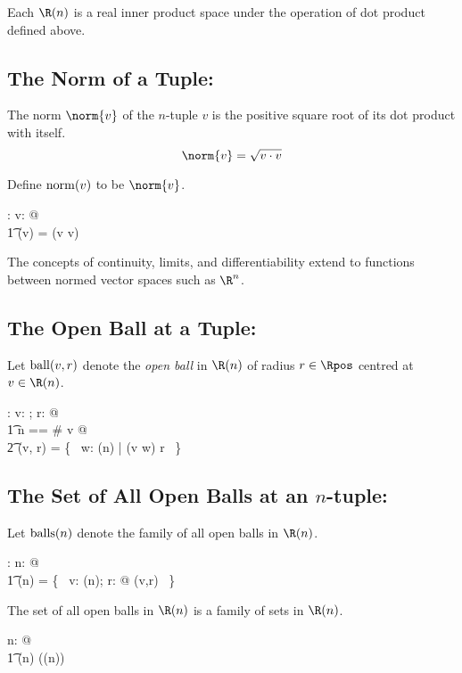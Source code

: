 \documentclass{amsart}
\begin{document}
Each $\Rtup(n)$ is a real inner product space under the operation of dot product defined above.

\subsection{The Norm of a Tuple: }

The norm $\norm{v}$ of the $n$-tuple $v$ is the positive square root of its dot product with itself.
$$
	\norm{v} = \sqrt{v \dotRinf v}
$$

Define $\operatorname{norm}(v)$ to be $\norm{v}$.
\begin{axdef}
	\normRinf: \Rinf \fun \R
\where
	\forall v: \Rinf @ \\
	\t1	\normRinf(v) = \sqrtR(v \dotRinf v)
\end{axdef}

The concepts of continuity, limits, and differentiability extend to functions between normed vector spaces such as $\R^n$.

\subsection{The Open Ball at a Tuple: }

Let $\operatorname{ball}(v,r)$ denote the \textit{open ball} in $\Rtup(n)$ of radius $r  \in \Rpos$ centred at $v \in \Rtup(n)$.

\begin{axdef}
\ballRinf: \Rinf \cross \Rpos \fun \power \Rinf
\where
\forall v: \Rinf; r: \Rpos @ \\
\t1	\LET n == \# v @ \\
\t2		\ballRinf(v, r) = \{~ w: \Rtup(n) | \normRinf(v \subRinf w) \ltR r ~\}
\end{axdef}

\subsection{The Set of All Open Balls at an $n$-tuple: }

Let $\operatorname{balls}(n)$ denote the family of all open balls in $\Rtup(n)$.

\begin{axdef}
	\ballsRtup: \nat \fun \Fam \Rinf
\where
	\forall n: \nat @ \\
	\t1	\ballsRtup(n) =  \{~ v: \Rtup(n); r: \Rpos @ \ballRinf(v,r) ~\}
\end{axdef}

\begin{remark}
The set of all open balls in $\Rtup(n)$ is a family of sets in $\Rtup(n)$.

\begin{zed}
\forall n: \nat @ \\
\t1	\ballsRtup(n) \in \Fam (\Rtup(n))
\end{zed}

\end{remark}
\end{document}
